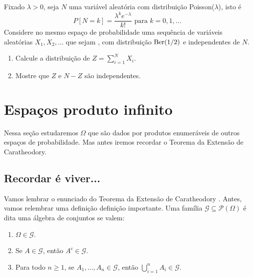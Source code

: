\begin{topics}
\begin{exercise}
  Fixado $\lambda > 0$, seja $N$ uma variável aleatória com distribuição Poisson($\lambda$), isto é
  \begin{equation}
    P[N = k] = \frac{\lambda^k e^{-\lambda}}{k!} \text{ para $k = 0, 1, \dots$}
  \end{equation}
  Considere no mesmo espaço de probabilidade uma sequência de variáveis aleatórias $X_1, X_2, \dots$ que sejam \iid, com distribuição $\operatorname{Ber}(1/2)$ e independentes de $N$.
  \begin{enumerate}[\quad a)]
  \item Calcule a distribuição de $Z = \sum_{i=1}^N X_i$.
  \item Mostre que $Z$ e $N - Z$ são independentes.
  \end{enumerate}
\end{exercise}

\end{topics}

\section{Espaços produto infinito}
\label{s:Omega_produto}

Nessa seção estudaremos $\Omega$ que são dados por produtos enumeráveis de outros espaços de probabilidade.
Mas antes iremos recordar o Teorema da Extensão de Caratheodory.

\subsection{Recordar é viver...}

Vamos lembrar o enunciado do Teorema da Extensão de Caratheodory .
Antes, vamos relembrar uma definição definição importante.
Uma família $\mathcal{G} \subseteq \mathcal{P}(\Omega)$ é dita uma álgebra de conjuntos  se valem:
\begin{enumerate}[\quad a)]
  \item $\Omega \in \mathcal{G}$.
  \item Se $A \in \mathcal{G}$, então $A^c \in \mathcal{G}$.
  \item Para todo $n \geq 1$, se $A_1, \dots, A_n \in \mathcal{G}$, então $\bigcup_{i=1}^n A_i \in \mathcal{G}$.
\end{enumerate}

